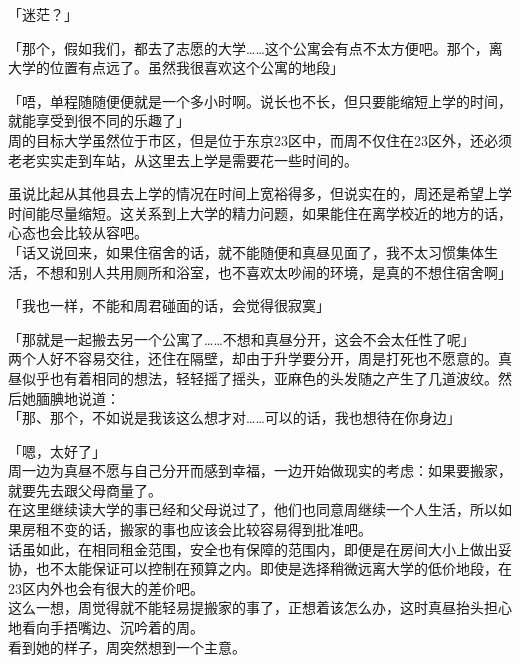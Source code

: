 「迷茫？」

「那个，假如我们，都去了志愿的大学……这个公寓会有点不太方便吧。那个，离大学的位置有点远了。虽然我很喜欢这个公寓的地段」

「唔，单程随随便便就是一个多小时啊。说长也不长，但只要能缩短上学的时间，就能享受到很不同的乐趣了」\\

周的目标大学虽然位于市区，但是位于东京23区中，而周不仅住在23区外，还必须老老实实走到车站，从这里去上学是需要花一些时间的。

虽说比起从其他县去上学的情况在时间上宽裕得多，但说实在的，周还是希望上学时间能尽量缩短。这关系到上大学的精力问题，如果能住在离学校近的地方的话，心态也会比较从容吧。\\

「话又说回来，如果住宿舍的话，就不能随便和真昼见面了，我不太习惯集体生活，不想和别人共用厕所和浴室，也不喜欢太吵闹的环境，是真的不想住宿舍啊」

「我也一样，不能和周君碰面的话，会觉得很寂寞」

「那就是一起搬去另一个公寓了……不想和真昼分开，这会不会太任性了呢」\\

两个人好不容易交往，还住在隔壁，却由于升学要分开，周是打死也不愿意的。真昼似乎也有着相同的想法，轻轻摇了摇头，亚麻色的头发随之产生了几道波纹。然后她腼腆地说道：\\

「那、那个，不如说是我该这么想才对……可以的话，我也想待在你身边」

「嗯，太好了」\\

周一边为真昼不愿与自己分开而感到幸福，一边开始做现实的考虑：如果要搬家，就要先去跟父母商量了。\\

在这里继续读大学的事已经和父母说过了，他们也同意周继续一个人生活，所以如果房租不变的话，搬家的事也应该会比较容易得到批准吧。\\

话虽如此，在相同租金范围，安全也有保障的范围内，即便是在房间大小上做出妥协，也不太能保证可以控制在预算之内。即使是选择稍微远离大学的低价地段，在23区内外也会有很大的差价吧。\\

这么一想，周觉得就不能轻易提搬家的事了，正想着该怎么办，这时真昼抬头担心地看向手捂嘴边、沉吟着的周。\\

看到她的样子，周突然想到一个主意。\\

